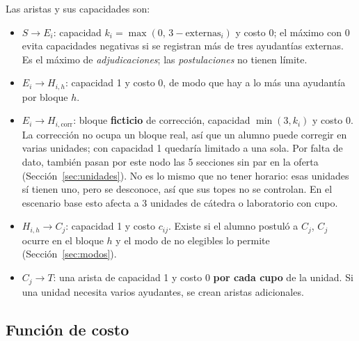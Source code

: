 \documentclass{article}
\begin{document}
Las aristas y sus capacidades son:

\begin{itemize}
    \item \textbf{$S \to E_i$}: capacidad $k_i = \max(0,\, 3 - \text{externas}_i)$ y costo 0; el máximo con 0 evita capacidades negativas si se registran más de tres ayudantías externas. Es el máximo de \emph{adjudicaciones}; las \emph{postulaciones} no tienen límite.
    \item \textbf{$E_i \to H_{i,h}$}: capacidad 1 y costo 0, de modo que hay a lo más una ayudantía por bloque $h$.
    \item \textbf{$E_i \to H_{i,\text{corr}}$}: bloque \textbf{ficticio} de corrección, capacidad $\min(3, k_i)$ y costo 0. La corrección no ocupa un bloque real, así que un alumno puede corregir en varias unidades; con capacidad 1 quedaría limitado a una sola. Por falta de dato, también pasan por este nodo las 5 secciones sin par en la oferta (Sección~\ref{sec:unidades}). No es lo mismo que no tener horario: esas unidades sí tienen uno, pero se desconoce, así que sus topes no se controlan. En el escenario base esto afecta a 3 unidades de cátedra o laboratorio con cupo.
    \item \textbf{$H_{i,h} \to C_j$}: capacidad 1 y costo $c_{ij}$. Existe si el alumno postuló a $C_j$, $C_j$ ocurre en el bloque $h$ y el modo de no elegibles lo permite (Sección~\ref{sec:modos}).
    \item \textbf{$C_j \to T$}: una arista de capacidad 1 y costo 0 \textbf{por cada cupo} de la unidad. Si una unidad necesita varios ayudantes, se crean aristas adicionales.
\end{itemize}

\subsection{Función de costo}
\end{document}
